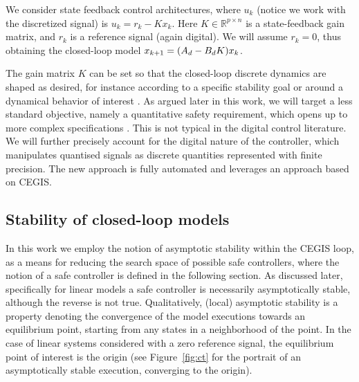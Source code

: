 We consider state feedback control architectures, 
where $u_k$ (notice we work with the discretized signal) is $u_k = r_{k} - K x_k$. 
Here $K \in \mathbb{R}^{p \times n}$ is a state-feedback gain matrix, 
and $r_{k}$ is a reference signal (again digital). 
We will assume $r_k=0$, thus obtaining the closed-loop model 
${x}_{k+1}=({A}_d-{B}_d{K}){x}_k$. 

The gain matrix $K$ can be set so that the closed-loop discrete dynamics are
shaped as desired, for instance according to a specific stability goal or
around a dynamical behavior of interest \cite{astrom1997computer}.  As argued
later in this work, we will target a less standard objective,
namely a quantitative safety requirement, which opens up to more complex specifications \cite{BYG16, Tab09}. 
This is not typical in the digital control literature. We will further precisely account for the digital nature
of the controller, which manipulates quantised signals as discrete quantities represented with
finite precision. The new approach is fully automated and leverages an approach based on CEGIS. 


\subsection{Stability of closed-loop models}

In this work we employ the notion of asymptotic stability within the CEGIS loop,  
as a means for reducing the search space of possible safe controllers, where the notion of a safe controller
is defined in the following section. 
As discussed later, specifically for linear models a safe controller is necessarily asymptotically stable, 
although the reverse is not true. 
Qualitatively, (local) asymptotic stability is a property denoting the convergence of the model executions towards an equilibrium point, 
starting from any states in a neighborhood of the point. 
In the case of linear systems %
considered with a zero reference signal, 
the equilibrium point of interest is the origin (see Figure~\ref{fig:ct} for the portrait of an asymptotically stable execution, converging to the origin). 

